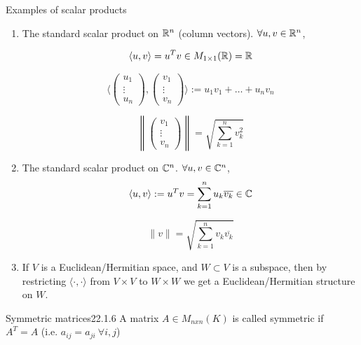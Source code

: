 \documentclass[12pt]{article}
\begin{document}
\begin{example}{Examples of scalar products}{}
    \begin{enumerate}
        \item The standard scalar product on $\mathbb{R}^n$ (column vectors). $\forall u, v \in \mathbb{R}^n$,

        $$
        \langle u, v \rangle = u^Tv \in M_{1\times1}(\mathbb{R}) = \mathbb{R}
        $$

        $$
        \langle 
            \begin{pmatrix}
                u_1 \\
                \vdots \\
                u_n
            \end{pmatrix},
             \begin{pmatrix}
                v_1 \\
                \vdots \\
                v_n
            \end{pmatrix}
        \rangle
        := u_1v_1 + \dots + u_nv_n
        $$

        $$
            \left\lVert \begin{pmatrix}
                v_1 \\
                \vdots \\
                v_n
            \end{pmatrix} \right\rVert
            = \sqrt{\sum_{k=1}^{n} v_k^2}
        $$

        \item The standard scalar product on $\mathbb{C}^n$. $\forall u, v \in \mathbb{C}^n$,
        $$
            \langle u, v \rangle := u^T v = \sum_{k = 1}^{n} u_k \overline{v_k} \in \mathbb{C}
        $$

        $$
            \lVert v \rVert = \sqrt{\sum_{k=1}^{n} v_k\overline{v_k}}
        $$

        \item If $V$ is a Euclidean/Hermitian space, and $W \subset V$ is a subspace, then by restricting $\langle \cdot, \cdot \rangle$ from $V \times V$ to $W \times W$ we get a Euclidean/Hermitian structure on $W$.

    \end{enumerate}
\end{example}

\begin{definition}{Symmetric matrices}{22.1.6}
    A matrix $A \in M_{nxn}(K)$ is called symmetric if $A^T = A$ (i.e. $a_{ij} = a_{ji} \ \forall i, j$)
\end{definition}
\end{document}
